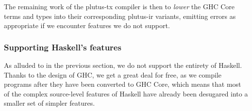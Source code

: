 The remaining work of the \gls{plutus-tx} compiler is then to \emph{lower} the GHC Core terms and types into their corresponding \gls{plutus-ir} variants, emitting errors as appropriate if we encounter features we do not support.

\subsubsection{Supporting Haskell's features}

As alluded to in the previous section, we do not support the entirety of Haskell.
Thanks to the design of GHC, we get a great deal for free, as we compile programs after they have been converted to GHC Core, which means that most of the complex source-level features of Haskell have already been desugared into a smaller set of simpler features.

